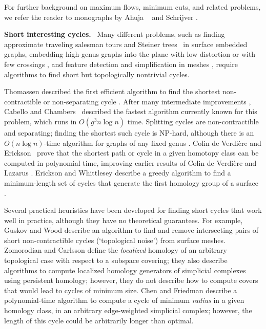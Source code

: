 \documentclass{sig-alternate}
\def\fakeparagraph#1{\medskip\noindent\textbf{#1}~}
\begin{document}
For further background on maximum flows, minimum cuts, and related problems, we refer the reader to monographs by Ahuja \etal\ \cite{amo-nftaa-93} and Schrijver \cite{s-cape-03}.

\fakeparagraph{Short interesting cycles.}
Many different problems, such as finding approximate traveling salesman tours  \cite{dhm-aacd-07} and Steiner trees~\cite{bdt-ptass-08} in surface embedded graphs, embedding high-genus graphs into the plane with low distortion \cite{is-pebgg-07} or with few crossings \cite{kr-ccnlt-07}, and feature detection and simplification in meshes \cite{gw-tnr-01,dlsc-cgaht-08}, require algorithms to find short but topologically nontrivial cycles.

Thomassen described the first efficient algorithm to find the shortest non-contractible or non-separating cycle \cite{t-egnsn-90, mt-gos-01}.  After many intermediate improvements \cite{c-mdpg-06, cm-fsnsn-07, eh-ocsd-04, k-csnco-06}, Cabello and Chambers~\cite{cc-msspg-07} described the fastest algorithm currently known for this problem, which runs in $O(g^3 n \log n)$ time.  Splitting cycles are non-contractible and separating; finding the shortest such cycle is {NP}-hard, although there is an $O(n \log n)$-time algorithm for graphs of any fixed genus \cite{ccelw-scsih-06, ccelw-scsih-08}.  Colin de Verdi\`ere and Erickson~\cite{ce-tspcs-06} prove that the shortest path or cycle in a given homotopy class can be computed in polynomial time, improving earlier results of Colin de Verdi\`ere and Lazarus \cite{c-rcds-03, cl-oslos-05, cl-opdsh-07}.  Erickson and Whittlesey describe a greedy algorithm to find a minimum-length set of cycles that generate the first homology group of a surface \cite{ew-gohhg-05}.

Several practical heuristics have been developed for finding short cycles that work well in practice, although they have no theoretical guarantees.  For example, Guskov and Wood \cite{gw-tnr-01} describe an algorithm to find and remove intersecting pairs of short non-contractible cycles (`topological noise') from surface meshes.  Zomorodian and Carlsson \cite{zc-lh-07} define the \emph{localized} homology of an arbitrary topological case with respect to a subspace covering; they also describe algorithms to compute localized homology generators of simplicial complexes using persistent homology; however, they do not describe how to compute covers that would lead to cycles of minimum size.  Chen and Friedman \cite{cf-qhc2-07, cf-qhc-08} describe a polynomial-time algorithm to compute a cycle of minimum \emph{radius} in a given homology class, in an arbitrary edge-weighted simplicial complex; however, the length of this cycle could be arbitrarily longer than optimal.
\end{document}

